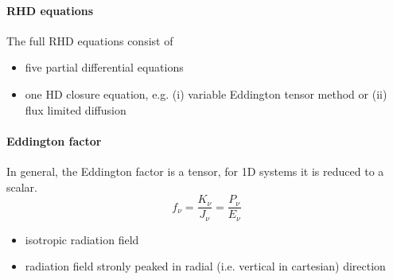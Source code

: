 \documentclass[10pt,a4paper]{article}
\begin{document}
\paragraph{RHD equations}
The full RHD equations consist of 
\begin{itemize}
\item five partial differential equations
\item one HD closure equation, e.g. (i) variable Eddington tensor method or (ii) flux limited diffusion
\end{itemize}

\paragraph{Eddington factor}
In general, the Eddington factor is a tensor, for 1D systems it is reduced to a scalar.
\begin{equation}
f_{\nu} = \frac{K_{\nu}}{J_{\nu}} = \frac{P_{\nu}}{E_{\nu}}
\end{equation}
\begin{itemize}
\item isotropic radiation field
\item radiation field stronly peaked in radial (i.e. vertical in cartesian) direction
\end{itemize}
\end{document}
